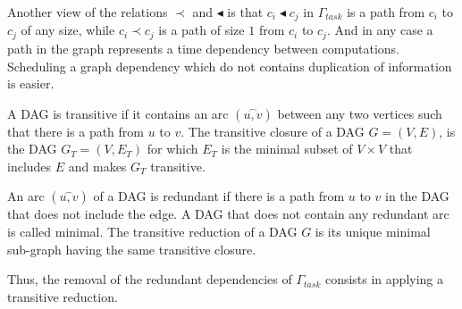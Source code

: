 Another view of the relations $\prec$ and $\blacktriangleleft$ is that $c_i\blacktriangleleft c_j$ in $\Gamma_{task}$ is a path from $c_i$ to $c_j$ of any size, while $c_i \prec c_j$ is a path of size $1$ from $c_i$ to $c_j$. And in any case a path in the graph represents a time dependency between computations. Scheduling a graph dependency which do not contains duplication of information is easier. 

\begin{mydef}
A DAG is transitive if it contains an arc $(\overset{\frown}{u,v})$ between any two vertices such that there is a path from $u$ to $v$. The transitive closure of a DAG $G=(V,E)$, is the DAG $G_T=(V,E_T)$ for which $E_T$ is the minimal subset of $V \times V$ that includes $E$ and makes $G_T$ transitive.
\end{mydef}

\begin{mydef}
An arc $(\overset{\frown}{u,v})$ of a DAG is redundant if there is a path from $u$ to $v$ in the DAG that does not include the edge. A DAG that does not contain any redundant arc is called minimal. The transitive reduction of a DAG $G$ is its unique minimal sub-graph having the same transitive closure.
\end{mydef}

Thus, the removal of the redundant dependencies of $\Gamma_{task}$ consists in applying a transitive reduction.


